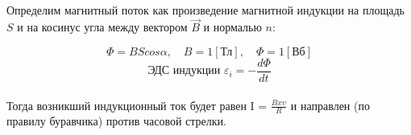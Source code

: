 \documentclass[dvipdfmx]{article}
\begin{document}
\paragraph{}

Определим магнитный поток как произведение магнитной индукции на площадь $S$ и на косинус угла между вектором
$\vec{B}$ и нормалью $n$:

\begin{equation*}
  \Phi = BScos\alpha, \quad
  B = 1 [\text{Тл}], \quad
  \Phi = 1 [\text{Вб}]
\end{equation*}
\begin{equation*}
  \text{ЭДС индукции } \varepsilon_i = -\frac{d\Phi}{dt}
\end{equation*}
\paragraph{}

\noindent{}
\paragraph{}

Тогда возникший индукционный ток будет равен I = $\frac{Bx\upsilon}{R}$ и направлен (по правилу буравчика)
против часовой стрелки.
\end{document}
